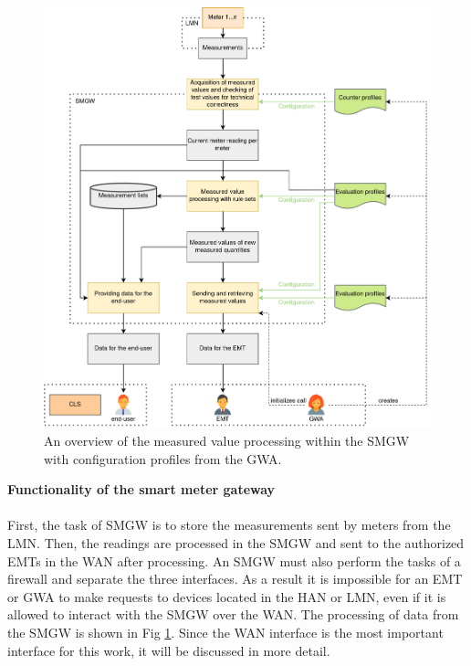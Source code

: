 \begin{figure}[tbp]
  \centering
  \includegraphics[width=1\textwidth]{images/MessverarbeitungEnglish2.png}
  \caption[Measured Value Processing in a SMGW]{An overview of the measured value processing within the \gls{SMGW} with configuration profiles from the GWA.}
  \label{fig:value_processing}
\end{figure}
\textbf{Functionality of the smart meter gateway}
\\
\\
First, the task of \gls{SMGW} is to store the measurements sent by meters from the \gls{LMN}. Then, the readings are processed in the \gls{SMGW} and sent to the authorized \gls{EMT}s in the \gls{WAN} after processing. An \gls{SMGW} must also perform the tasks of a firewall and separate the three interfaces. As a result it is impossible for an \gls{EMT} or \gls{GWA} to make requests to devices located in the \gls{HAN} or \gls{LMN}, even if it is allowed to interact with the \gls{SMGW} over the \gls{WAN}. The processing of data from the \gls{SMGW} is shown in Fig \ref{fig:value_processing}. Since the \gls{WAN} interface is the most important interface for this work, it will be discussed in more detail.\\
\\
